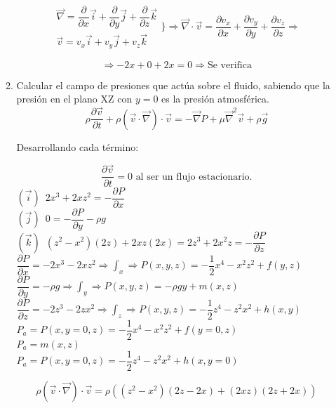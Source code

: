\begin{enumerate}
\begin{enumerate}
		\[
			\begin{matrix}
				\vec{\nabla} = 
					\dfrac{\partial}{\partial x} \vec{i} +
					\dfrac{\partial}{\partial y} \vec{j} +
					\dfrac{\partial}{\partial z} \vec{k}\\
				\vec{v} = v_x \vec{i} + v_y \vec{j} + v_z \vec{k}
			\end{matrix}
			\Biggr\} \Rightarrow
			\vec{\nabla}\cdot\vec{v} = 
				\dfrac{\partial v_x}{\partial x} + 
				\dfrac{\partial v_y}{\partial y} + 
				\dfrac{\partial v_z}{\partial z}	
			\Rightarrow
		\]
		
		\[\Rightarrow -2x+0+2x = 0 \Rightarrow \text{Se verifica}\]
		
	\black
	\item Calcular el campo de presiones que actúa sobre el fluido, sabiendo que la presión en el plano XZ con $y=0$ es la presión atmosférica.
	\blue
		\[
			\rho \dfrac{\partial \vec{v}}{\partial t} + \rho (\vec{v} \cdot \vec{\nabla}) \cdot \vec{v} =
				- \vec{\nabla} P + \mu \vec{\nabla}^2 \vec{v} + \rho \vec{g}
		\]
		
		Desarrollando cada término:
		
		\[\dfrac{\partial \vec{v}}{\partial t} = 0 \text{ al ser un flujo estacionario.}\]
		$(\vec{i})\,\,\,2x^3 + 2xz^2 = -\dfrac{\partial P}{\partial x}$\\
		$(\vec{j})\,\,\,0 = -\dfrac{\partial P}{\partial y} - \rho g$\\
		$(\vec{k})\,\,\,(z^2 - x^2)(2z) + 2xz(2x) = 2z^3 + 2x^2z = -\dfrac{\partial P}{\partial z}$\\
		
		$\dfrac{\partial P}{\partial x} = -2x^3 -2xz^2 \Rightarrow \int_x \Rightarrow P(x,y,z) = -\dfrac{1}{2} x^4 - x^2z^2 + f(y,z)$\\
		$\dfrac{\partial P}{\partial y} = -\rho g \Rightarrow \int_y \Rightarrow P(x,y,z) = -\rho g y + m(x,z)$\\
		$\dfrac{\partial P}{\partial z} = -2z^3 -2zx^2 \Rightarrow \int_z \Rightarrow P(x,y,z) = -\dfrac{1}{2} z^4 - z^2x^2 + h(x,y)$\\
		
		$P_a = P(x, y=0, z) = -\dfrac{1}{2} x^4 - x^2z^2 + f(y = 0,z)$\\
		$P_a = m(x,z)$\\
		$P_a = P(x, y=0, z) = -\dfrac{1}{2} z^4 - z^2x^2 + h(x,y=0)$
		
		\[\rho (\vec{v} \cdot \vec{\nabla}) \cdot \vec{v} = \rho ((z^2 - x^2)(2z-2x) + (2xz)(2z + 2x))\]
		

\end{enumerate}
\end{enumerate}
